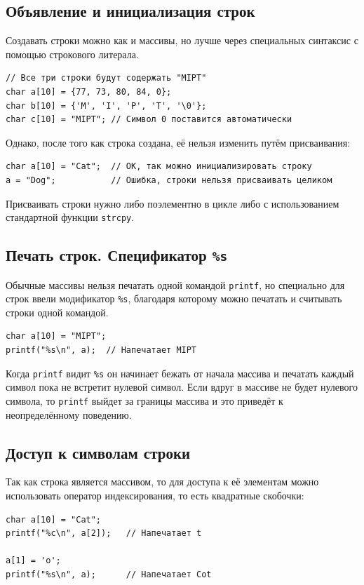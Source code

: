 \documentclass{article}
\begin{document}
\subsection*{Объявление и инициализация строк}
Создавать строки можно как и массивы, но лучше через специальных синтаксис с помощью строкового литерала. 
\begin{lstlisting}
// Все три строки будут содержать "MIPT"  
char a[10] = {77, 73, 80, 84, 0};
char b[10] = {'M', 'I', 'P', 'T', '\0'};
char c[10] = "MIPT"; // Символ 0 поставится автоматически
\end{lstlisting}
Однако, после того как строка создана, её нельзя изменить путём присваивания:
\begin{lstlisting}
char a[10] = "Cat";  // OK, так можно инициализировать строку
a = "Dog";			 // Ошибка, строки нельзя присваивать целиком
\end{lstlisting}
Присваивать строки нужно либо поэлементно в цикле либо с использованием стандартной функции \texttt{strcpy}.


\subsection*{Печать строк. Спецификатор \texttt{\%s}}
Обычные массивы нельзя печатать одной командой \texttt{printf}, но специально для строк ввели модификатор \texttt{\%s}, благодаря которому можно печатать и считывать строки одной командой.
\begin{lstlisting}
char a[10] = "MIPT";
printf("%s\n", a);  // Напечатает MIPT
\end{lstlisting}
Когда \texttt{printf} видит \texttt{\%s} он начинает бежать от начала массива и печатать каждый символ пока не встретит нулевой символ. Если вдруг в массиве не будет нулевого символа, то \texttt{printf} выйдет за границы массива и это приведёт к неопределённому поведению.

\subsection*{Доступ к символам строки}
Так как строка является массивом, то для доступа к её элементам можно использовать оператор индексирования, то есть квадратные скобочки:
\begin{lstlisting}
char a[10] = "Cat";
printf("%c\n", a[2]);  	// Напечатает t

a[1] = 'o';	
printf("%s\n", a);		// Напечатает Cot
\end{lstlisting}
\end{document}
